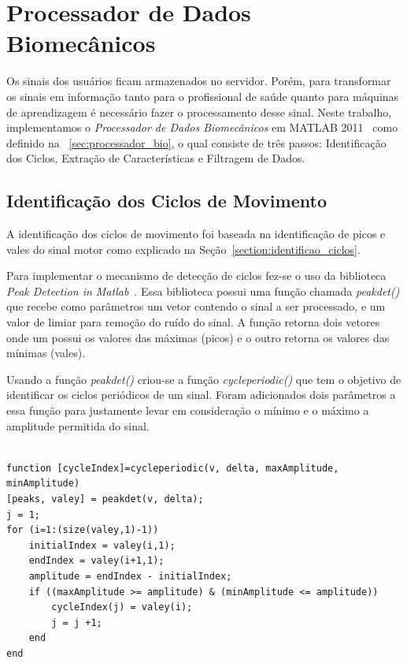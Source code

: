 \section{Processador de Dados Biomecânicos}
Os sinais dos usuários ficam armazenados no servidor. Porém, para transformar os sinais em informação tanto para o profissional de saúde quanto para máquinas de aprendizagem é necessário fazer o processamento desse sinal. Neste trabalho, implementamos o \textit{Processador de Dados Biomecânicos} em MATLAB 2011~\cite{matlab2011} como definido na ~\ref{sec:processador_bio}, o qual consiste de três passos: Identificação dos Ciclos, Extração de Características e Filtragem de Dados.

\subsection{Identificação dos Ciclos de Movimento} 
A identificação dos ciclos de movimento foi baseada na identificação de picos e vales do sinal motor como explicado na Seção~\ref{section:identificao_ciclos}. 

Para implementar o mecanismo de detecção de ciclos fez-se o uso da biblioteca \textit{Peak Detection in Matlab}~\cite{peakdetect}. Essa biblioteca possui uma função chamada \textit{peakdet()} que recebe como parâmetros um vetor contendo o sinal a ser processado, e um valor de limiar para remoção do ruído do sinal. A função retorna dois vetores onde um possui os valores das máximas (picos) e o outro retorna os valores das mínimas (vales).

Usando a função \textit{peakdet()} criou-se a função \textit{cycleperiodic()} que tem o objetivo de identificar os ciclos periódicos de um sinal. Foram adicionados dois parâmetros a essa função para justamente levar em consideração o mínimo e o máximo a amplitude permitida do sinal.

\begin{lstlisting}[frame=single, caption=Função de Ciclo Periódico]  % Start your code-block

function [cycleIndex]=cycleperiodic(v, delta, maxAmplitude, minAmplitude)
[peaks, valey] = peakdet(v, delta);
j = 1;
for (i=1:(size(valey,1)-1))    
    initialIndex = valey(i,1);
    endIndex = valey(i+1,1);
    amplitude = endIndex - initialIndex;
    if ((maxAmplitude >= amplitude) & (minAmplitude <= amplitude))
        cycleIndex(j) = valey(i);
        j = j +1;
    end
end
\end{lstlisting}

